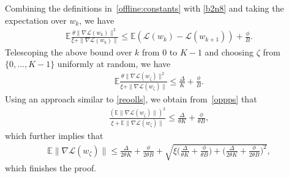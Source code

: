 \documentclass{osudissert96}
\begin{document}
Combining the definitions in~\cref{offline:constants}  with \cref{b2n8} and taking the expectation over  $w_k$,  we have
	\begin{align*}
	\mathbb{E}\frac{\theta \|\nabla \mathcal{L}(w_k)\|^2}{\xi + \|\nabla \mathcal{L}(w_k)\|} \leq \mathbb{E}( \mathcal{L}(w_{k})  - \mathcal{L}(w_{k+1})     ) + \frac{\phi}{B}.
	\end{align*}
	Telescoping the above bound over $k$ from $0$ to $K-1$ and choosing $\zeta$  from $\{0,...,K-1\}$ uniformly at random, we have
	\begin{align}\label{oppps}
	\mathbb{E}\frac{\theta \|\nabla \mathcal{L}(w_\zeta)\|^2}{\xi + \|\nabla \mathcal{L}(w_\zeta)\|}  \leq \frac{\Delta}{K} +\frac{\phi}{B}. 
	\end{align}
	Using an approach similar to \cref{reoolls}, we obtain from~\cref{oppps} that 
	\begin{align*}
	\frac{	(\mathbb{E}\|\nabla \mathcal{L}(w_\zeta)\|)^2}{\xi + 	\mathbb{E}\|\nabla \mathcal{L}(w_\zeta)\|}  \leq \frac{\Delta}{\theta K} +\frac{\phi}{\theta B},
	\end{align*}
	which further implies that 
	\begin{align}\label{iolscasa}
	\mathbb{E}\|\nabla \mathcal{L}(w_\zeta)\| \leq \frac{\Delta}{2\theta K} +\frac{\phi}{2\theta B} + \sqrt{ \xi \Big(\frac{\Delta}{\theta K} +\frac{\phi}{\theta B}\Big) + \Big(\frac{\Delta}{2\theta K} +\frac{\phi}{2\theta B}\Big)^2 },
	\end{align}
	which finishes the proof. 
\end{document}
